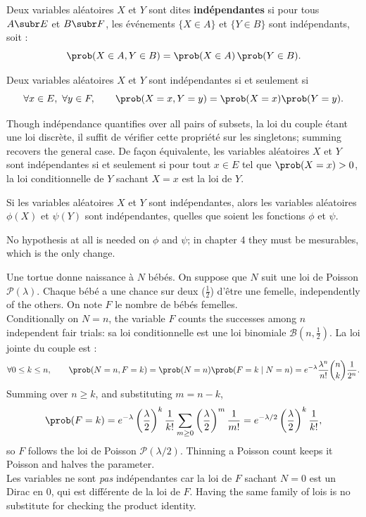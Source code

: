 \begin{definition}
  Deux variables aléatoires $X$ et $Y$ sont dites \textbf{indépendantes} si pour
  tous $A \subr E$ et $B \subr F$, les événements $\{X \in A\}$ et
  $\{Y \in B\}$ sont indépendants, soit :
  \[ \prob(X \in A, Y \in B) = \prob(X \in A)\,\prob(Y \in B). \]
\end{definition}

\begin{prop}
  Deux variables aléatoires $X$ et $Y$ sont indépendantes si et seulement si
  \[ \forall x \in E,\ \forall y \in F, \qquad
     \prob(X = x, Y = y) = \prob(X = x)\prob(Y = y). \]
\end{prop}

Though indépendance quantifies over all pairs of subsets, la loi du couple étant
une loi discrète, il suffit de vérifier cette propriété sur les singletons;
summing recovers the general case. De façon équivalente,
les variables aléatoires $X$ et $Y$ sont indépendantes si et seulement si pour
tout $x \in E$ tel que $\prob(X=x) > 0$, la loi conditionnelle de $Y$ sachant
$X = x$ est la loi de $Y$.

\begin{prop}
  Si les variables aléatoires $X$ et $Y$ sont indépendantes, alors les
  variables aléatoires $\phi(X)$ et $\psi(Y)$ sont indépendantes, quelles que
  soient les fonctions $\phi$ et $\psi$.
\end{prop}

No hypothesis at all is needed on $\phi$ and $\psi$; in chapter 4 they must be
mesurables, which is the only change.

\begin{example}
  Une tortue donne naissance à $N$ bébés. On suppose que $N$ suit une loi de
  Poisson $\mathcal{P}(\lambda)$. Chaque bébé a une chance sur deux
  ($\tfrac{1}{2}$) d'être une femelle, independently of the others. On note $F$
  le nombre de bébés femelles.\\

  Conditionally on $N = n$, the variable $F$ counts the successes among $n$
  independent fair trials: sa loi conditionnelle est une loi binomiale
  $\mathcal{B}(n, \tfrac12)$. La loi jointe du couple est :
  \[ \forall 0 \le k \le n, \qquad
     \prob(N = n, F = k) = \prob(N=n)\prob(F = k \mid N = n)
       = e^{-\lambda} \frac{\lambda^{n}}{n!} \binom{n}{k} \frac{1}{2^{n}}. \]
  Summing over $n \ge k$, and substituting $m = n-k$,
  \[ \prob(F = k) = e^{-\lambda} \left(\frac{\lambda}{2}\right)^{k}
       \frac{1}{k!} \sum_{m \ge 0} \left(\frac{\lambda}{2}\right)^{m}
       \frac{1}{m!}
     = e^{-\lambda/2} \left(\frac{\lambda}{2}\right)^{k} \frac{1}{k!}, \]
  so $F$ follows the loi de Poisson $\mathcal{P}(\lambda/2)$. Thinning a
  Poisson count keeps it Poisson and halves the parameter.\\

  Les variables ne sont \emph{pas} indépendantes car la loi de $F$ sachant
  $N = 0$ est un Dirac en $0$, qui est différente de la loi de $F$. Having the
  same family of lois is no substitute for checking the product identity.
\end{example}

